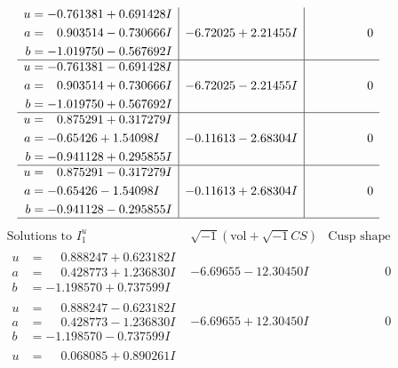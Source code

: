 \documentclass[1p]{elsarticle_modified}
\theoremstyle{definition}
\newcommand{\I}{\sqrt{-1}}
\begin{document}
$$\begin{array}{c|c|c}
\begin{aligned}
u &= -0.761381 + 0.691428 I \\
a &= \phantom{-}0.903514 - 0.730666 I \\
b &= -1.019750 - 0.567692 I\end{aligned}
 & -6.72025 + 2.21455 I & \phantom{-0.000000 } 0 \\ \hline\begin{aligned}
u &= -0.761381 - 0.691428 I \\
a &= \phantom{-}0.903514 + 0.730666 I \\
b &= -1.019750 + 0.567692 I\end{aligned}
 & -6.72025 - 2.21455 I & \phantom{-0.000000 } 0 \\ \hline\begin{aligned}
u &= \phantom{-}0.875291 + 0.317279 I \\
a &= -0.65426 + 1.54098 I \\
b &= -0.941128 + 0.295855 I\end{aligned}
 & -0.11613 - 2.68304 I & \phantom{-0.000000 } 0 \\ \hline\begin{aligned}
u &= \phantom{-}0.875291 - 0.317279 I \\
a &= -0.65426 - 1.54098 I \\
b &= -0.941128 - 0.295855 I\end{aligned}
 & -0.11613 + 2.68304 I & \phantom{-0.000000 } 0\\
 \hline 
 \end{array}$$\newpage$$\begin{array}{c|c|c}  
\text{Solutions to }I^u_{1}& \I (\text{vol} + \sqrt{-1}CS) & \text{Cusp shape}\\
 \hline 
\begin{aligned}
u &= \phantom{-}0.888247 + 0.623182 I \\
a &= \phantom{-}0.428773 + 1.236830 I \\
b &= -1.198570 + 0.737599 I\end{aligned}
 & -6.69655 - 12.30450 I & \phantom{-0.000000 } 0 \\ \hline\begin{aligned}
u &= \phantom{-}0.888247 - 0.623182 I \\
a &= \phantom{-}0.428773 - 1.236830 I \\
b &= -1.198570 - 0.737599 I\end{aligned}
 & -6.69655 + 12.30450 I & \phantom{-0.000000 } 0 \\ \hline\begin{aligned}
u &= \phantom{-}0.068085 + 0.890261 I \\

\end{aligned}
\end{array}$$
\end{document}
